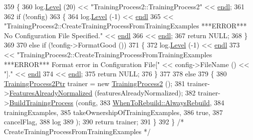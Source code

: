 \begin{DoxyCode}
359 \{
360   log.\hyperlink{class_k_k_b_1_1_run_log_a32cf761d7f2e747465fd80533fdbb659}{Level} (20) << \textcolor{stringliteral}{"TrainingProcess2::TrainingProcess2"} << \hyperlink{namespace_k_k_b_ad1f50f65af6adc8fa9e6f62d007818a8}{endl};
361 
362   \textcolor{keywordflow}{if}  (!config)
363   \{
364     log.\hyperlink{class_k_k_b_1_1_run_log_a32cf761d7f2e747465fd80533fdbb659}{Level} (-1) << \hyperlink{namespace_k_k_b_ad1f50f65af6adc8fa9e6f62d007818a8}{endl}
365       << \textcolor{stringliteral}{"TrainingProcess2::CreateTrainingProcessFromTrainingExamples   ***ERROR***   No Configuration File
       Specified."} << \hyperlink{namespace_k_k_b_ad1f50f65af6adc8fa9e6f62d007818a8}{endl}
366       << \hyperlink{namespace_k_k_b_ad1f50f65af6adc8fa9e6f62d007818a8}{endl};
367     \textcolor{keywordflow}{return} NULL;
368   \}
369 
370   \textcolor{keywordflow}{else}  \textcolor{keywordflow}{if}  (!config->FormatGood ())
371   \{
372     log.\hyperlink{class_k_k_b_1_1_run_log_a32cf761d7f2e747465fd80533fdbb659}{Level} (-1) << \hyperlink{namespace_k_k_b_ad1f50f65af6adc8fa9e6f62d007818a8}{endl}
373       <<  \textcolor{stringliteral}{"TrainingProcess2::CreateTrainingProcessFromTrainingExamples   ***ERROR***   Format error in
       Configuration File["} << config->FileName () << \textcolor{stringliteral}{"]."}  << \hyperlink{namespace_k_k_b_ad1f50f65af6adc8fa9e6f62d007818a8}{endl}
374       << \hyperlink{namespace_k_k_b_ad1f50f65af6adc8fa9e6f62d007818a8}{endl};
375     \textcolor{keywordflow}{return} NULL;
376   \}
377 
378   \textcolor{keywordflow}{else}
379   \{
380     \hyperlink{class_k_k_m_l_l_1_1_training_process2}{TrainingProcess2Ptr}  trainer = \textcolor{keyword}{new} \hyperlink{class_k_k_m_l_l_1_1_training_process2_a56455bc6c87316ccfd3afbe4c3323f5e}{TrainingProcess2} ();
381     trainer->\hyperlink{class_k_k_m_l_l_1_1_training_process2_a258a13bc5acfd8f6b0eb5444ba8eef97}{FeaturesAlreadyNormalized} (featuresAlreadyNormalized);
382     trainer->\hyperlink{class_k_k_m_l_l_1_1_training_process2_a8b80079d09f7813e347343ebbefb14fb}{BuildTrainingProcess} (config,
383                                    \hyperlink{class_k_k_m_l_l_1_1_training_process2_acc48e76f6978c8c8c0c849eec2d0ee53af19cc2f24e3b601e28ca877505de0d4b}{WhenToRebuild::AlwaysRebuild},
384                                    trainingExamples, 
385                                    takeOwnershipOfTrainingExamples, 
386                                    \textcolor{keyword}{true}, 
387                                    cancelFlag, 
388                                    log
389                                   );
390     \textcolor{keywordflow}{return}  trainer;
391   \}
392 \}  \textcolor{comment}{/* CreateTrainingProcessFromTrainingExamples */}
\end{DoxyCode}
